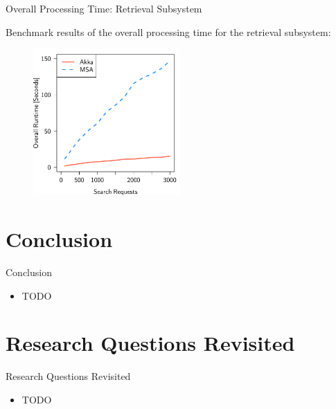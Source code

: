 \documentclass{beamer}
\begin{document}

\begin{frame}{Overall Processing Time: Retrieval Subsystem}

Benchmark results of the overall processing time for the retrieval subsystem:

\begin{center}
  \begin{figure} 
    \includegraphics[width=0.5\textwidth]{graphics/eval-search-rtt-overall.pdf} 
  \end{figure}
\end{center}

\end{frame}


\section{Conclusion}


\begin{frame}{Conclusion}

\begin{itemize}
  \item TODO
\end{itemize}

\end{frame}


\section{Research Questions Revisited}


\begin{frame}{Research Questions Revisited}

\begin{itemize}
  \item TODO
\end{itemize}

\end{frame}

\end{document}
